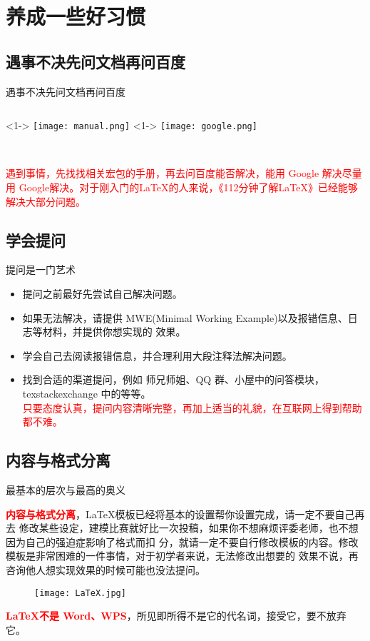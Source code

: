 \section{养成一些好习惯}
\subsection{遇事不决先问文档再问百度}

\begin{frame}{遇事不决先问文档再问百度}
	\begin{columns}
		<1->
		\texttt{[image: manual.png]}
		<1->
		\texttt{[image: google.png]}
	\end{columns}	~\\
{
	\textcolor{red}{遇到事情，先找找相关宏包的手册，再去问百度能否解决，能用 Google 解决尽量用 Google解决。对于刚入门的\LaTeX 的人来说，《112分钟了解\LaTeX》已经能够解决大部分问题。}
}		
	
\end{frame}

\subsection{学会提问}
\begin{frame}{提问是一门艺术}
	\begin{itemize}
		\item 提问之前最好先尝试自己解决问题。
		\item 如果无法解决，请提供 MWE(Minimal Working Example)以及报错信息、日志等材料，并提供你想实现的
		效果。
		\item 学会自己去阅读报错信息，并合理利用大段注释法解决问题。
		\item 找到合适的渠道提问，例如 师兄师姐、QQ 群、小屋中的问答模块，texstackexchange 中的等等。\\[1cm]
		
		{	\centering
			\textcolor{red}{只要态度认真，提问内容清晰完整，再加上适当的礼貌，在互联网上得到帮助都不难。}
		}
	\end{itemize}
\end{frame}

\subsection{内容与格式分离}
\begin{frame}{最基本的层次与最高的奥义}
	
	
	\textcolor{red}{\bfseries 内容与格式分离}，\LaTeX 模板已经将基本的设置帮你设置完成，请一定不要自己再去
	修改某些设定，建模比赛就好比一次投稿，如果你不想麻烦评委老师，也不想因为自己的强迫症影响了格式而扣
	分，就请一定不要自行修改模板的内容。修改模板是非常困难的一件事情，对于初学者来说，无法修改出想要的
	效果不说，再咨询他人想实现效果的时候可能也没法提问。	
	\begin{figure}
		\centering
		\texttt{[image: LaTeX.jpg]}
	\end{figure}
	\textcolor{red}{\bfseries \LaTeX 不是 Word、WPS}，所见即所得不是它的代名词，接受它，要不放弃它。
\end{frame}


